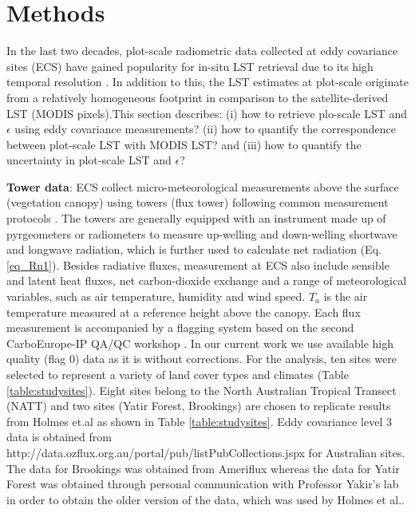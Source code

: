 \documentclass[fleqn,10pt]{wlscirep}
\begin{document}
 \section{Methods}
 In the last two decades, plot-scale radiometric data collected at eddy covariance sites (ECS) have gained popularity for in-situ LST retrieval due to its high temporal resolution \cite{stoy2013data,cullen2007energy}. In addition to this, the LST estimates at plot-scale originate from a relatively homogeneous footprint in comparison to the satellite-derived LST (MODIS pixels).This section describes: (i) how to retrieve plo-scale LST and $\epsilon$ using eddy covariance measurements? (ii) how to quantify the correspondence between plot-scale LST with MODIS LST? and (iii) how to quantify the uncertainty in plot-scale LST and $\epsilon$? 
 
 \textbf{Tower data}:
ECS collect micro-meteorological measurements above the surface (vegetation canopy) using towers (flux tower) following common measurement protocols \cite{baldocchi2001fluxnet}. The towers are generally equipped with an instrument made up of pyrgeometers or radiometers to measure up-welling and down-welling shortwave and longwave radiation, which is further used to calculate net radiation (Eq. \ref{eq_Rn1}). Besides radiative fluxes, measurement at ECS also include sensible and latent heat fluxes, net carbon-dioxide exchange and a range of meteorological variables, such as air temperature, humidity and wind speed. $T_{a}$ is the air temperature measured at a reference height above the canopy. Each flux measurement is accompanied by a flagging system based on the second CarboEurope-IP QA/QC workshop \cite{gilberto2020fluxnet2015}. In our current work we use available high quality (flag 0) data as it is without corrections. For the analysis, ten sites were selected to represent a variety of land cover types and climates (Table \ref{table:studysites}). Eight sites belong to the North Australian Tropical Transect (NATT) and two sites (Yatir Forest, Brookings) are chosen to replicate results from Holmes et.al\cite{holmes2009land} as shown in Table \ref{table:studysites}. Eddy covariance level 3 data is obtained from http://data.ozflux.org.au/portal/pub/listPubCollections.jspx for Australian sites. The data for Brookings was obtained from Ameriflux whereas the data for Yatir Forest was obtained through personal communication with Professor Yakir's lab in order to obtain the older version of the data, which was used by Holmes et al.\cite{holmes2009land}.
\end{document}
